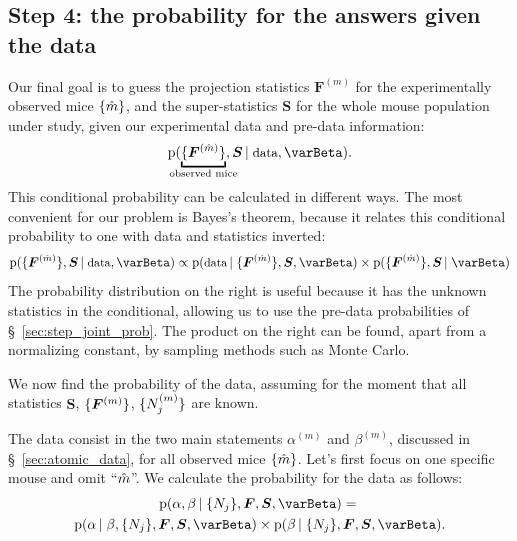 \documentclass[\ifafour a4paper,12pt,\else a5paper,10pt,\fi%
onecolumn,oneside,article,%
british%
]{memoir}
\theoremstyle{remark}
\theoremstyle{innote}
\newcommand*{\pf}{\mathrm{p}}%
\renewcommand*{\|}[1][]{\nonscript\,#1\vert\nonscript\;\mathopen{}}
\newcommand*{\sect}{\S}%
\newcommand*{\yI}{\varBeta}
\newcommand*{\yF}{\bm{F}}
\newcommand*{\yFm}[1][m]{\yF^{(#1)}}
\newcommand*{\yNm}[1][m]{N^{(#1)}}
\newcommand*{\ySS}{S}
\newcommand*{\yS}{\bm{\ySS}}
\DeclarePairedDelimiter\tu{\{}{\}}
\newcommand*{\ymh}{\Hat{m}}
\newcommand*{\ka}{\alpha}
\newcommand*{\kb}{\beta}
\newcommand*{\kam}[1][m]{\ka^{(#1)}}
\newcommand*{\kbm}[1][m]{\kb^{(#1)}}
\begin{document}
\subsection{Step 4: the probability for the answers given the data}
\label{sec:step4_answer_from_data}

Our final goal is to guess the projection statistics $\yFm$ for the
experimentally observed mice $\tu{\ymh}$, and the super-statistics $\yS$
for the whole mouse population under study, given our experimental data and
pre-data information:
\begin{equation}
  \label{eq:guess_given_data}
  \pf(\underbracket{\tu{\yFm[\ymh]}}_{\mathclap{\text{observed mice}}}, \yS
  \| \text{\small data}, \yI).
\end{equation}
This conditional probability can be calculated in different ways. The most
convenient for our problem is Bayes's theorem, because it relates this
conditional probability to one with data and statistics inverted:
\begin{equation}
  \label{eq:bayes_data_answers}
  \pf(\tu{\yFm[\ymh]}, \yS
  \| \text{\small data}, \yI)
  \propto
  \pf( \text{\small data} \|
  \tu{\yFm[\ymh]}, \yS, \yI)
  \times \pf( \tu{\yFm[\ymh]}, \yS \| \yI)
\end{equation}
The probability distribution on the right is useful because it has the
unknown statistics in the conditional, allowing us to use the pre-data
probabilities of \sect~\ref{sec:step_joint_prob}. The product on the right
can be found, apart from a normalizing constant, by sampling methods such
as Monte Carlo.


\medskip

We now find the probability of the data, assuming for the moment that all
statistics $\yS$, $\tu{\yFm}$, $\tu{\yNm_{j}}$ are known.

The data consist in the two main statements $\kam$ and $\kbm$, discussed in
\sect~\ref{sec:atomic_data}, for all observed mice $\tu{\ymh}$. Let's first
focus on one specific mouse and omit \enquote{$\ymh$}. We calculate the
probability for the data as follows:
\begin{multline}
  \label{eq:alph_beta_given_stats}
  \pf( \ka,\kb \|\tu{N_{j}},  \yF, \yS, \yI) ={}\\
  \pf( \ka \|\kb, \tu{N_{j}},  \yF, \yS, \yI) \times
    \pf( \kb \|\tu{N_{j}},  \yF, \yS, \yI).
\end{multline}
\end{document}
